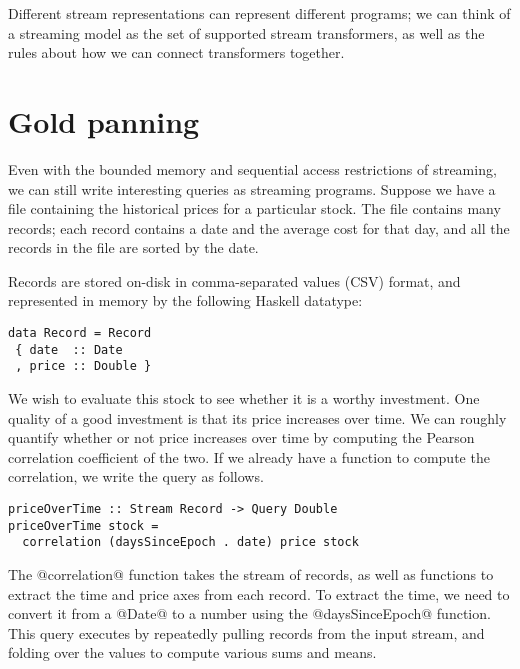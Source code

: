  Different stream representations can represent different programs; we can think of a streaming model as the set of supported stream transformers, as well as the rules about how we can connect transformers together.


\section{Gold panning}
Even with the bounded memory and sequential access restrictions of streaming, we can still write interesting queries as streaming programs.
Suppose we have a file containing the historical prices for a particular stock.
The file contains many records; each record contains a date and the average cost for that day, and all the records in the file are sorted by the date.

Records are stored on-disk in comma-separated values (CSV) format, and represented in memory by the following Haskell datatype:

\begin{lstlisting}
data Record = Record
 { date  :: Date
 , price :: Double }
\end{lstlisting}

We wish to evaluate this stock to see whether it is a worthy investment.
One quality of a good investment is that its price increases over time.
We can roughly quantify whether or not price increases over time by computing the Pearson correlation coefficient of the two.
If we already have a function to compute the correlation, we write the query as follows.

\begin{lstlisting}
priceOverTime :: Stream Record -> Query Double
priceOverTime stock =
  correlation (daysSinceEpoch . date) price stock
\end{lstlisting}

The @correlation@ function takes the stream of records, as well as functions to extract the time and price axes from each record.
To extract the time, we need to convert it from a @Date@ to a number using the @daysSinceEpoch@ function.
This query executes by repeatedly pulling records from the input stream, and folding over the values to compute various sums and means.

